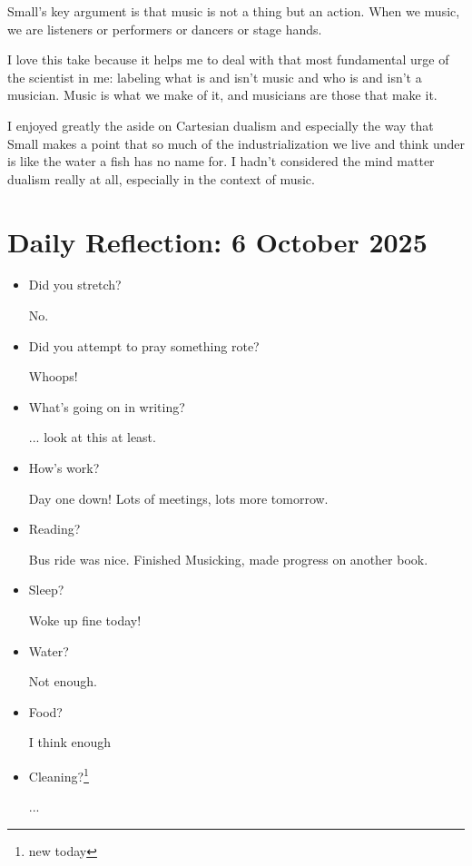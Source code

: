 \documentclass[12pt]{article}
\renewcommand{\,}{\textsuperscript{,}}
\begin{document}
Small's key argument is that music is not a thing but an action.  
When we music, we are listeners or performers or dancers or stage hands.

I love this take because it helps me to deal with that most fundamental urge of the scientist in me: labeling what is and isn't music and who is and isn't a musician.  
Music is what we make of it, and musicians are those that make it.

I enjoyed greatly the aside on Cartesian dualism and especially the way that Small makes a point that so much of the industrialization we live and think under is like the water a fish has no name for.  
I hadn't considered the mind matter dualism really at all, especially in the context of music.

\section{Daily Reflection: 6 October 2025}

\begin{itemize}

\item Did you stretch?

No.

\item Did you attempt to pray something rote?

Whoops!

\item What's going on in writing?

... look at this at least.

\item How's work?

Day one down! Lots of meetings, lots more tomorrow.

\item Reading?

Bus ride was nice.  
Finished Musicking, made progress on another book.

\item Sleep?

Woke up fine today!

\item Water?

Not enough.

\item Food?

I think enough

\item Cleaning?\footnote{new today}

...

\end{itemize}
\end{document}
